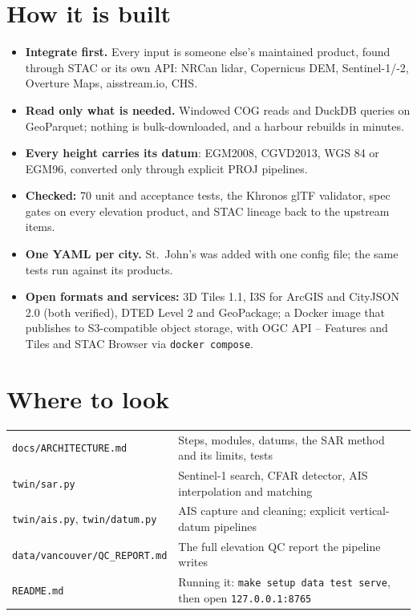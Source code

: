 \documentclass[10pt,letterpaper]{article}
\begin{document}
\section{How it is built}
\small
\begin{minipage}[t]{0.485\textwidth}
\begin{itemize}
\item \textbf{Integrate first.} Every input is someone else's maintained product, found through STAC or its own API: NRCan lidar, Copernicus DEM, Sentinel-1/-2, Overture Maps, aisstream.io, CHS.
\item \textbf{Read only what is needed.} Windowed COG reads and DuckDB queries on GeoParquet; nothing is bulk-downloaded, and a harbour rebuilds in minutes.
\item \textbf{Every height carries its datum}: EGM2008, CGVD2013, WGS 84 or EGM96, converted only through explicit PROJ pipelines.
\end{itemize}
\end{minipage}\hfill
\begin{minipage}[t]{0.485\textwidth}
\begin{itemize}
\item \textbf{Checked:} 70 unit and acceptance tests, the Khronos glTF validator, spec gates on every elevation product, and STAC lineage back to the upstream items.
\item \textbf{One YAML per city.} St.\ John's was added with one config file; the same tests run against its products.
\item \textbf{Open formats and services:} 3D Tiles 1.1, I3S for ArcGIS and CityJSON 2.0 (both verified), DTED Level 2 and GeoPackage; a Docker image that publishes to S3-compatible object storage, with OGC API -- Features and Tiles and STAC Browser via \texttt{docker compose}.
\end{itemize}
\end{minipage}
\normalsize

\section{Where to look}
\small
\begin{tabularx}{\textwidth}{@{}>{\raggedright\arraybackslash}p{}X@{}}
\texttt{docs/ARCHITECTURE.md} & Steps, modules, datums, the SAR method and its limits, tests\\
\texttt{twin/sar.py} & Sentinel-1 search, CFAR detector, AIS interpolation and matching\\
\texttt{twin/ais.py}, \texttt{twin/datum.py} & AIS capture and cleaning; explicit vertical-datum pipelines\\
\texttt{data/vancouver/QC\_REPORT.md} & The full elevation QC report the pipeline writes\\
\texttt{README.md} & Running it: \texttt{make setup data test serve}, then open \texttt{127.0.0.1:8765}\\
\end{tabularx}
\end{document}
